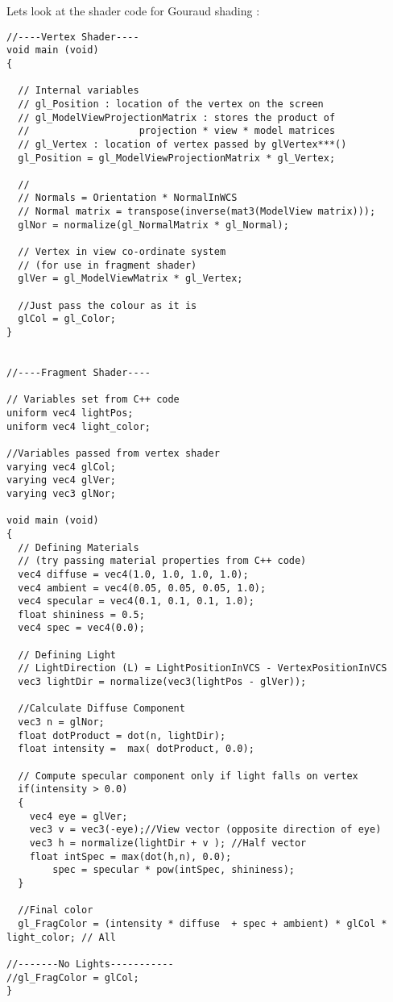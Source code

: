 \documentclass[11pt]{article}
\begin{document}
Lets look at the shader code for Gouraud shading :
\begin{lstlisting}
//----Vertex Shader----
void main (void) 
{
	
  // Internal variables
  // gl_Position : location of the vertex on the screen
  // gl_ModelViewProjectionMatrix : stores the product of 
  //                   projection * view * model matrices 
  // gl_Vertex : location of vertex passed by glVertex***()
  gl_Position = gl_ModelViewProjectionMatrix * gl_Vertex; 

  //
  // Normals = Orientation * NormalInWCS
  // Normal matrix = transpose(inverse(mat3(ModelView matrix)));
  glNor = normalize(gl_NormalMatrix * gl_Normal);

  // Vertex in view co-ordinate system 
  // (for use in fragment shader)
  glVer = gl_ModelViewMatrix * gl_Vertex;

  //Just pass the colour as it is
  glCol = gl_Color;
}


//----Fragment Shader----

// Variables set from C++ code
uniform vec4 lightPos;
uniform vec4 light_color;

//Variables passed from vertex shader
varying vec4 glCol;
varying vec4 glVer;
varying vec3 glNor;

void main (void) 
{
  // Defining Materials 
  // (try passing material properties from C++ code)
  vec4 diffuse = vec4(1.0, 1.0, 1.0, 1.0); 
  vec4 ambient = vec4(0.05, 0.05, 0.05, 1.0);
  vec4 specular = vec4(0.1, 0.1, 0.1, 1.0);
  float shininess = 0.5;
  vec4 spec = vec4(0.0); 
  
  // Defining Light 
  // LightDirection (L) = LightPositionInVCS - VertexPositionInVCS
  vec3 lightDir = normalize(vec3(lightPos - glVer)); 
  
  //Calculate Diffuse Component
  vec3 n = glNor;
  float dotProduct = dot(n, lightDir);
  float intensity =  max( dotProduct, 0.0);

  // Compute specular component only if light falls on vertex
  if(intensity > 0.0)
  {
	vec4 eye = glVer;
	vec3 v = vec3(-eye);//View vector (opposite direction of eye)
	vec3 h = normalize(lightDir + v ); //Half vector
   	float intSpec = max(dot(h,n), 0.0);	
        spec = specular * pow(intSpec, shininess);
  }  	
  
  //Final color 
  gl_FragColor = (intensity * diffuse  + spec + ambient) * glCol * light_color; // All
     
//-------No Lights-----------
//gl_FragColor = glCol;
}
     

\end{lstlisting}
\end{document}
